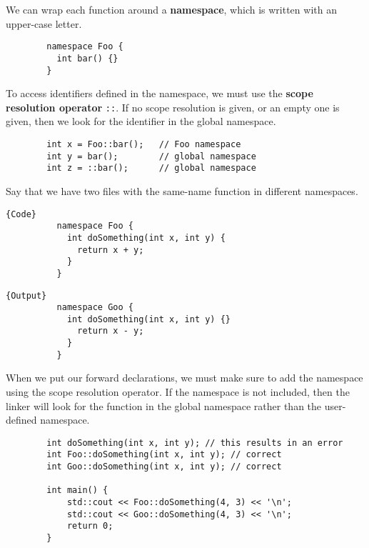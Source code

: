 \documentclass{article}
\begin{document}
    \begin{definition}[Namespace]
      We can wrap each function around a \textbf{namespace}, which is written with an upper-case letter. 
      \begin{lstlisting}
        namespace Foo {
          int bar() {}
        }
      \end{lstlisting}
      To access identifiers defined in the namespace, we must use the \textbf{scope resolution operator} \texttt{::}. If no scope resolution is given, or an empty one is given, then we look for the identifier in the global namespace. 
      \begin{lstlisting}
        int x = Foo::bar();   // Foo namespace
        int y = bar();        // global namespace
        int z = ::bar();      // global namespace 
      \end{lstlisting}
    \end{definition} 

    \begin{example}[Namespace]
      Say that we have two files with the same-name function in different namespaces. 
      
      \noindent\begin{minipage}{.5\textwidth}
        \begin{lstlisting}[]{Code}
          namespace Foo {
            int doSomething(int x, int y) {
              return x + y;
            }
          }
        \end{lstlisting}
        \end{minipage}
        \hfill
        \begin{minipage}{.49\textwidth}
        \begin{lstlisting}[]{Output}
          namespace Goo {
            int doSomething(int x, int y) {}
              return x - y;
            }
          }
        \end{lstlisting}
      \end{minipage}

      When we put our forward declarations, we must make sure to add the namespace using the scope resolution operator. If the namespace is not included, then the linker will look for the function in the global namespace rather than the user-defined namespace. 

      \begin{lstlisting}
        int doSomething(int x, int y); // this results in an error 
        int Foo::doSomething(int x, int y); // correct
        int Goo::doSomething(int x, int y); // correct

        int main() {
            std::cout << Foo::doSomething(4, 3) << '\n'; 
            std::cout << Goo::doSomething(4, 3) << '\n'; 
            return 0;
        }
      \end{lstlisting}
    \end{example} 
\end{document}
